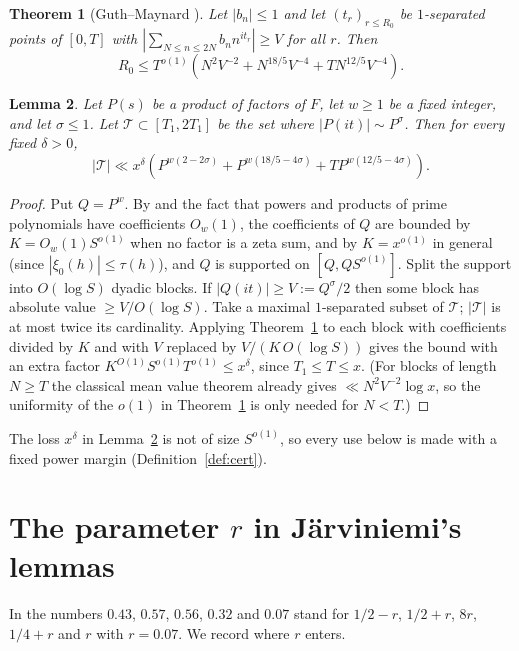 \documentclass[11pt]{amsart}
\newtheorem{theorem}{Theorem}[section]
\newtheorem{lemma}[theorem]{Lemma}
\theoremstyle{definition}
\theoremstyle{remark}
\newcommand{\J}{\cite{J}}
\begin{document}
\begin{theorem}[Guth--Maynard {\cite[Theorem~1.1]{GM}}]\label{thm:GM}
Let $|b_n|\le1$ and let $(t_r)_{r\le R_0}$ be $1$-separated points of $[0,T]$ with $|\sum_{N\le n\le 2N}b_nn^{it_r}|\ge V$ for all $r$. Then
\[R_0\le T^{o(1)}\left(N^2V^{-2}+N^{18/5}V^{-4}+TN^{12/5}V^{-4}\right).\]
\end{theorem}

\begin{lemma}\label{lem:GMmeasure}
Let $P(s)$ be a product of factors of $F$, let $w\ge1$ be a fixed integer, and let $\sigma\le1$. Let $\mathcal T\subset[T_1,2T_1]$ be the set where $|P(it)|\sim P^{\sigma}$. Then for every fixed $\delta>0$,
\[
|\mathcal T|\ll x^{\delta}\left(P^{w(2-2\sigma)}+P^{w(18/5-4\sigma)}+T P^{w(12/5-4\sigma)}\right).
\]
\end{lemma}

\begin{proof}
Put $Q=P^w$. By \cite[Lemma~5.3]{J} and the fact that powers and products of prime polynomials have coefficients $O_w(1)$, the coefficients of $Q$ are bounded by $K=O_w(1)S^{o(1)}$ when no factor is a zeta sum, and by $K=x^{o(1)}$ in general (since $|\xi_0(h)|\le\tau(h)$), and $Q$ is supported on $[Q,QS^{o(1)}]$. Split the support into $O(\log S)$ dyadic blocks. If $|Q(it)|\ge V:=Q^{\sigma}/2$ then some block has absolute value $\ge V/O(\log S)$. Take a maximal $1$-separated subset of $\mathcal T$; $|\mathcal T|$ is at most twice its cardinality. Applying Theorem~\ref{thm:GM} to each block with coefficients divided by $K$ and with $V$ replaced by $V/(K\,O(\log S))$ gives the bound with an extra factor $K^{O(1)}S^{o(1)}T^{o(1)}\le x^{\delta}$, since $T_1\le T\le x$. (For blocks of length $N\ge T$ the classical mean value theorem already gives $\ll N^2V^{-2}\log x$, so the uniformity of the $o(1)$ in Theorem~\ref{thm:GM} is only needed for $N<T$.)
\end{proof}

The loss $x^{\delta}$ in Lemma~\ref{lem:GMmeasure} is not of size $S^{o(1)}$, so every use below is made with a fixed power margin (Definition~\ref{def:cert}).

\section{The parameter \texorpdfstring{$r$}{r} in Järviniemi's lemmas}\label{sec:r}

In \J{} the numbers $0.43$, $0.57$, $0.56$, $0.32$ and $0.07$ stand for $1/2-r$, $1/2+r$, $8r$, $1/4+r$ and $r$ with $r=0.07$. We record where $r$ enters.
\end{document}
